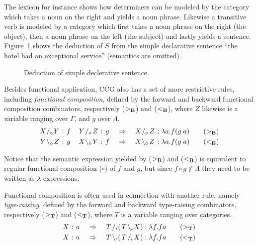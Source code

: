 The lexicon for instance shows how determiners can be modeled by the category which takes a noun on the right and yields a noun phrase. Likewise a transitive verb is modeled by a category which first takes a noun phrase on the right (the object), then a noun phrase on the left (the subject) and lastly yields a sentence. Figure~\ref{fig:simpleSentence} shows the deduction of $S$ from the simple declarative sentence ``the hotel had an exceptional service'' (semantics are omitted).
\vfill
\begin{figure}[ht]
\center
{}
\caption{Deduction of simple declerative sentence.}
\label{fig:simpleSentence}
\end{figure}
\vfill
\clearpage

Besides functional application, CCG also has a set of more restrictive rules, including \emph{functional composition}, defined by the forward and backward functional composition combinators, respectively (${>_{\bf B}}$) and (${<_{\bf B}}$), where $Z$ likewise is a variable ranging over $\Gamma$, and $g$ over $\Lambda$.
\begin{align*}
  \catvar{X}   /_\diamond  \catvar{Y} : \fvar{f} \quad \catvar{Y}  /_\diamond   \catvar{Z} : \fvar{g}
  &\quad\Rightarrow\quad
  \catvar{X}   /_\diamond  \catvar{Z} : \lambda a . f ( g \; a)
  \tag{${>_{\bf B}}$} \\
  \catvar{Y} \bsl_\diamond \catvar{Z} : \fvar{g} \quad \catvar{X} \bsl_\diamond \catvar{Y} : \fvar{f} 
  &\quad\Rightarrow\quad
  \catvar{X} \bsl_\diamond \catvar{Z} : \lambda a . f ( g \; a)
  \tag{${<_{\bf B}}$}
\end{align*}
\vspace{-1.5em}

Notice that the semantic expression yielded by (${>_{\bf B}}$) and (${<_{\bf B}}$) is equivalent to regular functional composition ($\circ$) of $f$ and $g$, but since $f \circ g \not \in \Lambda$ they need to be written as $\lambda$-expressions.

Functional composition is often used in connection with another rule, namely \emph{type-raising}, defined by the forward and backward type-raising combinators, respectively (${>_{\bf T}}$) and (${<_{\bf T}}$), where $T$ is a variable ranging over categories.
\begin{align*}
  \catvar{X} : \fvar{a}
  &\quad\Rightarrow\quad
  \catvar{T}/_\iota ( \catvar{T} \bsl_\iota \catvar{X} ) : \lambda f . f a
  \tag{$>_\mathbf{T}$} \\
  \catvar{X} : \fvar{a}
  &\quad\Rightarrow\quad
  \catvar{T}\bsl_\iota ( \catvar{T} /_\iota \catvar{X} ) : \lambda f . f a
  \tag{$<_\mathbf{T}$}
\end{align*}
\vspace{-1.5em}

